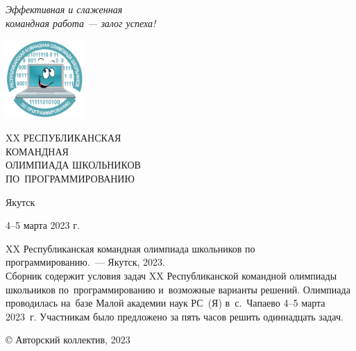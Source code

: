\documentclass[a5paper, twoside, 11pt]{article}
\begin{document}
\pagestyle{empty}

\begin{flushright}
\it
Эффективная и слаженная\\
командная работа --- залог успеха!
\end{flushright}
{}\vskip-15mm

\includegraphics[width=3cm, height=3cm]{logo.pdf}
\\[3cm]

\begin{center}
\huge
XX РЕСПУБЛИКАНСКАЯ \\КОМАНДНАЯ\\ОЛИМПИАДА ШКОЛЬНИКОВ \\
ПО~ПРОГРАММИРОВАНИЮ
\end{center}

\vfill
\centerline{Якутск}
\centerline{4--5 марта 2023 г.}
\newpage
\noindent XX Республиканская командная олимпиада школьников по программированию.~--- Якутск, 2023.
\\[5mm]
Сборник содержит условия задач XX Республиканской командной олимпиады школьников по~программированию 
и~возможные варианты решений. Олимпиада проводилась на~базе Малой академии наук РС~(Я) в~с.~Чапаево
4--5 марта 2023~г. Участникам было предложено за пять часов решить одиннадцать задач. 
\vfill

{}\hfill © Авторский коллектив, 2023
\end{document}
